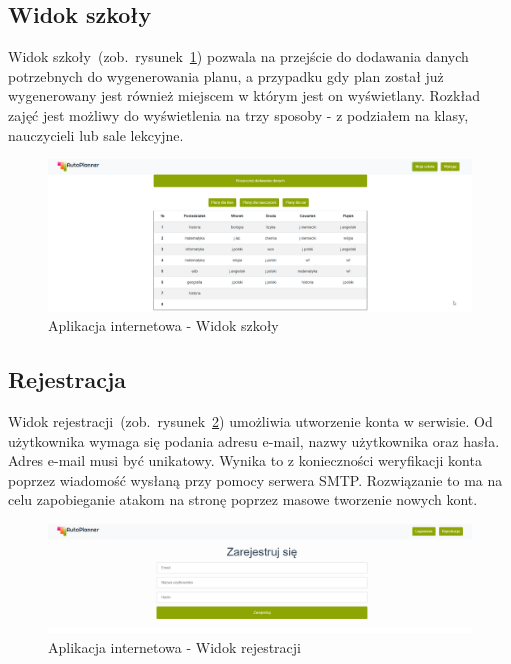 \subsection{Widok szkoły}
Widok szkoły~(zob.~rysunek~\ref{rys:school}) pozwala na przejście do dodawania danych potrzebnych do wygenerowania planu, a przypadku gdy plan został już wygenerowany jest również miejscem w którym jest on wyświetlany. Rozkład zajęć jest możliwy do wyświetlenia na trzy sposoby - z podziałem na klasy, nauczycieli lub sale lekcyjne.

\begin{figure}[!ht]
\centering\includegraphics[width=\textwidth]{figures/school}
\caption{Aplikacja internetowa - Widok szkoły}\label{rys:school}
\end{figure}
\subsection{Rejestracja}
Widok rejestracji~(zob.~rysunek~\ref{rys:register}) umożliwia utworzenie konta w serwisie. Od użytkownika wymaga się podania adresu e-mail, nazwy użytkownika oraz hasła. Adres e-mail musi być unikatowy. Wynika to z konieczności weryfikacji konta poprzez wiadomość wysłaną przy pomocy serwera SMTP. Rozwiązanie to ma na celu zapobieganie atakom na stronę poprzez masowe tworzenie nowych kont. 
\begin{figure}[!ht]
\centering\includegraphics[width=\textwidth]{figures/register}
\caption{Aplikacja internetowa - Widok rejestracji}\label{rys:register}
\end{figure}
